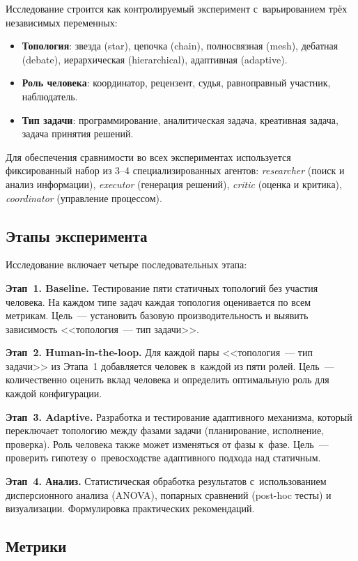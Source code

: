 \documentclass[12pt, a4paper]{article}
\begin{document}
Исследование строится как контролируемый эксперимент с~варьированием трёх независимых переменных:
\begin{itemize}[noitemsep]
    \item \textbf{Топология}: звезда (star), цепочка (chain), полносвязная (mesh), дебатная (debate), иерархическая (hierarchical), адаптивная (adaptive).
    \item \textbf{Роль человека}: координатор, рецензент, судья, равноправный участник, наблюдатель.
    \item \textbf{Тип задачи}: программирование, аналитическая задача, креативная задача, задача принятия решений.
\end{itemize}

Для обеспечения сравнимости во всех экспериментах используется фиксированный набор из 3--4 специализированных агентов: \textit{researcher} (поиск и анализ информации), \textit{executor} (генерация решений), \textit{critic} (оценка и критика), \textit{coordinator} (управление процессом).

\subsection{Этапы эксперимента}

Исследование включает четыре последовательных этапа:

\textbf{Этап~1. Baseline.} Тестирование пяти статичных топологий без участия человека. На каждом типе задач каждая топология оценивается по всем метрикам. Цель~--- установить базовую производительность и выявить зависимость <<топология~--- тип задачи>>.

\textbf{Этап~2. Human-in-the-loop.} Для каждой пары <<топология~--- тип задачи>> из Этапа~1 добавляется человек в~каждой из пяти ролей. Цель~--- количественно оценить вклад человека и определить оптимальную роль для каждой конфигурации.

\textbf{Этап~3. Adaptive.} Разработка и тестирование адаптивного механизма, который переключает топологию между фазами задачи (планирование, исполнение, проверка). Роль человека также может изменяться от фазы к~фазе. Цель~--- проверить гипотезу о~превосходстве адаптивного подхода над статичным.

\textbf{Этап~4. Анализ.} Статистическая обработка результатов с~использованием дисперсионного анализа (ANOVA), попарных сравнений (post-hoc тесты) и визуализации. Формулировка практических рекомендаций.

\subsection{Метрики}
\end{document}
